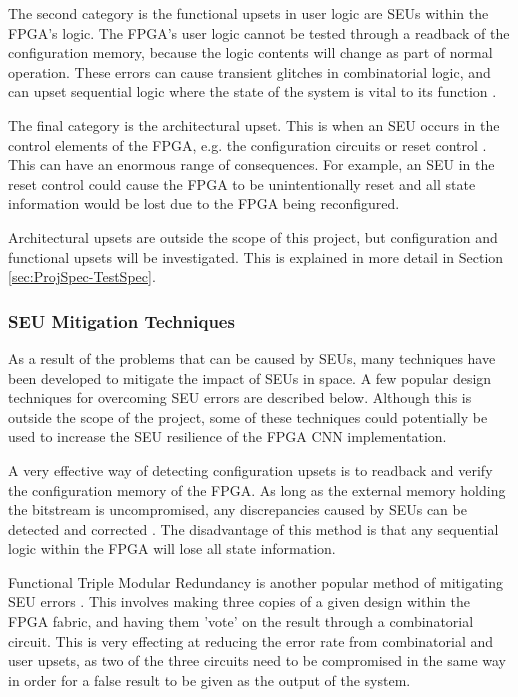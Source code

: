 \documentclass[12pt]{article}
\begin{document}
The second category is the functional upsets in user logic are SEUs within the FPGA's logic. The FPGA's user logic cannot be tested through a readback of the configuration memory, because the logic contents will change as part of normal operation. These errors can cause transient glitches in combinatorial logic, and can upset sequential logic where the state of the system is vital to its function \cite{FTripleMR}.

The final category is the architectural upset. This is when an SEU occurs in the control elements of the FPGA, e.g. the configuration circuits or reset control \cite{SuitabilityGaisler}. This can have an enormous range of consequences. For example, an SEU in the reset control could cause the FPGA to be unintentionally reset and all state information would be lost due to the FPGA being reconfigured.

Architectural upsets are outside the scope of this project, but configuration and functional upsets will be investigated. This is explained in more detail in Section \ref{sec:ProjSpec-TestSpec}.

\subsubsection{SEU Mitigation Techniques}
\label{sec:Background-FPGAsAndSpaceApplications-Mitigation}


As a result of the problems that can be caused by SEUs, many techniques have been developed to mitigate the impact of SEUs in space. A few popular design techniques for overcoming SEU errors are described below. Although this is outside the scope of the project, some of these techniques could potentially be used to increase the SEU resilience of the FPGA CNN implementation.

A very effective way of detecting configuration upsets is to readback and verify the configuration memory of the FPGA. As long as the external memory holding the bitstream is uncompromised, any discrepancies caused by SEUs can be detected and corrected \cite{SuitabilityGaisler}. The disadvantage of this method is that any sequential logic within the FPGA will lose all state information.

Functional Triple Modular Redundancy is another popular method of mitigating SEU errors \cite{FTripleMR}. This involves making three copies of a given design within the FPGA fabric, and having them 'vote' on the result through a combinatorial circuit. This is very effecting at reducing the error rate from combinatorial and user upsets, as two of the three circuits need to be compromised in the same way in order for a false result to be given as the output of the system.
\end{document}
